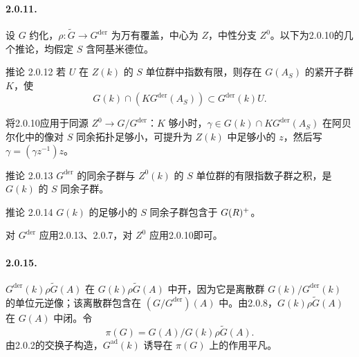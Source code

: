 \paragraph*{2.0.11.} 设 $G$ 约化，$\rho:\widetilde G\to G^{\mathrm{der}}$ 为万有覆盖，中心为 $Z$，中性分支 $Z^0$。以下为2.0.10的几个推论，均假定 $S$ 含阿基米德位。
\begin{originaltheorem}{推论 2.0.12}
若 $U$ 在 $Z(k)$ 的 $S$ 单位群中指数有限，则存在 $G(A_S)$ 的紧开子群 $K$，使
\[
 G(k)\cap(KG^{\mathrm{der}}(A_S))\subset G^{\mathrm{der}}(k)U.
\]
\end{originaltheorem}
将2.0.10应用于同源 $Z^0\to G/G^{\mathrm{der}}$：$K$ 够小时，$\gamma\in G(k)\cap KG^{\mathrm{der}}(A_S)$ 在阿贝尔化中的像对 $S$ 同余拓扑足够小，可提升为 $Z(k)$ 中足够小的 $z$，然后写 $\gamma=(\gamma z^{-1})z$。
\begin{originaltheorem}{推论 2.0.13}
$G^{\mathrm{der}}$ 的同余子群与 $Z^0(k)$ 的 $S$ 单位群的有限指数子群之积，是 $G(k)$ 的 $S$ 同余子群。
\end{originaltheorem}
\begin{originaltheorem}{推论 2.0.14}
$G(k)$ 的足够小的 $S$ 同余子群包含于 $G(R)^+$。
\end{originaltheorem}
对 $G^{\mathrm{der}}$ 应用2.0.13、2.0.7，对 $Z^0$ 应用2.0.10即可。
\paragraph*{2.0.15.} $G^{\mathrm{der}}(k)\rho\widetilde G(A)$ 在 $G(k)\rho\widetilde G(A)$ 中开，因为它是离散群 $G(k)/G^{\mathrm{der}}(k)$ 的单位元逆像；该离散群包含在 $(G/G^{\mathrm{der}})(A)$ 中。由2.0.8，$G(k)\rho\widetilde G(A)$ 在 $G(A)$ 中闭。令
\begin{equation}
 \pi(G)=G(A)/G(k)\rho\widetilde G(A).
 \tag{2.0.15.1}
\end{equation}
由2.0.2的交换子构造，$G^{\mathrm{ad}}(k)$ 诱导在 $\pi(G)$ 上的作用平凡。

